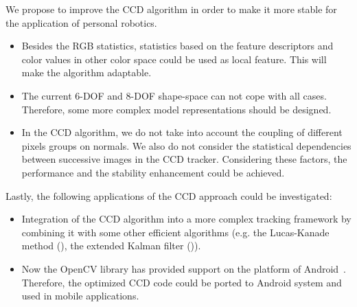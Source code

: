 We propose to improve the CCD algorithm in order to make it
more stable for the application of personal robotics.
\begin{itemize}
\item Besides the RGB statistics, statistics based on the feature
  descriptors and color values in other color space could be used as
  local feature. This will make the algorithm adaptable.
\item The current 6-DOF and 8-DOF shape-space can not cope with all
  cases.%
Therefore, some more complex model representations should be designed.
\item In the CCD algorithm, we do not take into account
  the coupling of different pixels groups on normals. We also
  do not consider the statistical dependencies between successive
  images in the CCD tracker. Considering these factors, the performance and
  the stability enhancement could be achieved.
\end{itemize}

Lastly, the following applications of the CCD approach could be investigated:
\begin{itemize}
\item Integration of the CCD algorithm into a more complex
  tracking framework by combining it with some other efficient
  algorithms (e.g. the Lucas-Kanade method (), the extended Kalman
  filter ()).
\item Now the OpenCV library has provided support on the platform of
  Android~\cite{android}. Therefore, the optimized CCD code could be ported to
  Android system and used in mobile applications.
\end{itemize}
